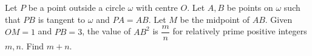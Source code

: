 Let $P$ be a point outside a circle $\omega$ with centre $O$. Let $A,B$ be points on $\omega$ such that $PB$ is tangent to $\omega$ and $PA=AB$. Let $M$ be the midpoint of $AB$. Given $OM=1$ and $PB=3$, the value of $AB^2$ is $\dfrac mn$ for relatively prime positive integers $m,n$. Find $m+n$.
